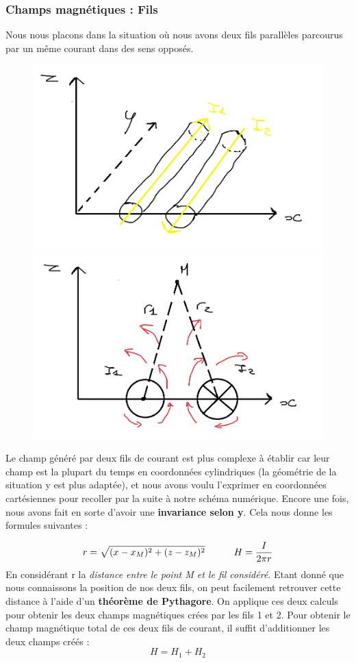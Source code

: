 \documentclass[10pt,a4paper]{article}
\begin{document}
\subsubsection{Champs magnétiques : Fils }
Nous nous placons dans la situation où nous avons deux fils parallèles parcourus par un même courant dans des sens opposés.
\begin{figure}[h]
	\centering
    \includegraphics[width=.4\linewidth]{img_yamato/Fils.png}
    \includegraphics[width=.4\linewidth]{img_yamato/Fils2.png}
\end{figure}
\newline
Le champ généré par deux fils de courant est plus complexe à établir car leur champ est la plupart du temps en coordonnées cylindriques (la géométrie de la situation y est plus adaptée), et nous avons voulu l'exprimer en coordonnées cartésiennes pour recoller par la suite à notre schéma numérique. Encore une fois, nous avons fait en sorte d'avoir une \textbf{invariance selon y}. Cela nous donne les formules suivantes \cite{site5} :

\begin{equation}
r = \sqrt{(x-x_{M})^2 + (z-z_{M})^2} \indent\indent H = \frac{I}{2\pi r}
\label{eq24}
\end{equation}
En considérant r la \textit{distance entre le point M et le fil considéré}. Etant donné que nous connaissons la position de nos deux fils, on peut facilement retrouver cette distance à l'aide d'un \textbf{théorème de Pythagore}.
\newline
On applique ces deux calculs pour obtenir les deux champs magnétiques crées par les fils 1 et 2. Pour obtenir le champ magnétique total de ces deux fils de courant, il suffit d'additionner les deux champs créés :
\begin{equation}
H = H_{1} + H_{2}
\label{eq25}
\end{equation}
\end{document}
